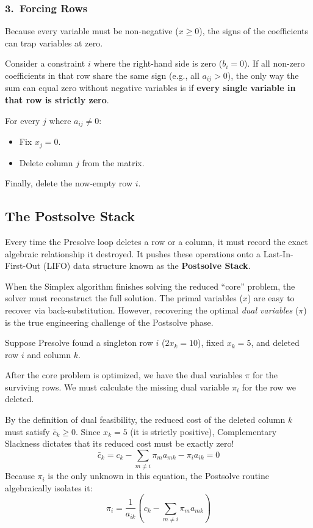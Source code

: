 \documentclass[11pt, a4paper]{article}
\begin{document}
\subsubsection*{3.\ Forcing Rows}

Because every variable must be non-negative ($x \ge 0$), the signs of the coefficients can trap variables at zero.

\begin{algostep}
Consider a constraint $i$ where the right-hand side is zero ($b_i = 0$). 
If all non-zero coefficients in that row share the same sign (e.g., all $a_{ij} > 0$), the only way the sum can equal zero without negative variables is if \textbf{every single variable in that row is strictly zero}.

For every $j$ where $a_{ij} \neq 0$:
\begin{itemize}[itemsep=2pt]
    \item Fix $x_j = 0$.
    \item Delete column $j$ from the matrix.
\end{itemize}
Finally, delete the now-empty row $i$.
\end{algostep}

\subsection{The Postsolve Stack}

Every time the Presolve loop deletes a row or a column, it must record the exact algebraic relationship it destroyed. It pushes these operations onto a Last-In-First-Out (LIFO) data structure known as the \textbf{Postsolve Stack}.

When the Simplex algorithm finishes solving the reduced ``core'' problem, the solver must reconstruct the full solution. The primal variables ($x$) are easy to recover via back-substitution. However, recovering the optimal \emph{dual variables} ($\pi$) is the true engineering challenge of the Postsolve phase.

\begin{example}
Suppose Presolve found a singleton row $i$ ($2 x_k = 10$), fixed $x_k = 5$, and deleted row $i$ and column $k$. 

After the core problem is optimized, we have the dual variables $\pi$ for the surviving rows. We must calculate the missing dual variable $\pi_i$ for the row we deleted. 

By the definition of dual feasibility, the reduced cost of the deleted column $k$ must satisfy $\bar{c}_k \ge 0$. Since $x_k = 5$ (it is strictly positive), Complementary Slackness dictates that its reduced cost must be exactly zero!
\[
\bar{c}_k = c_k - \sum_{m \neq i} \pi_m a_{mk} - \pi_i a_{ik} = 0
\]
Because $\pi_i$ is the only unknown in this equation, the Postsolve routine algebraically isolates it:
\[
\pi_i = \frac{1}{a_{ik}} \left( c_k - \sum_{m \neq i} \pi_m a_{mk} \right)
\]
\end{example}
\end{document}
